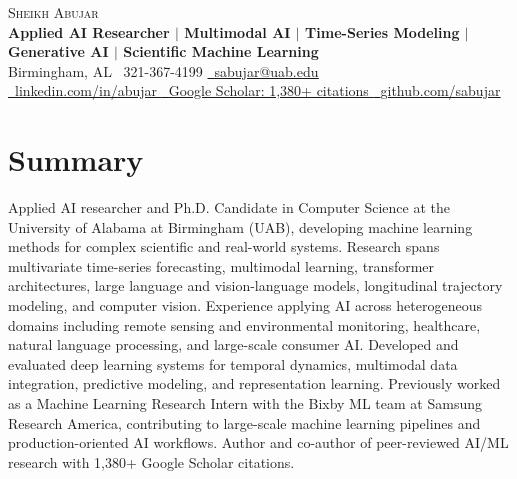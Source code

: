 \documentclass[letterpaper,10pt]{article}
\begin{document}

\begin{center}

    {\Huge \scshape Sheikh Abujar} \\[-1pt]

    \textbf{
    Applied AI Researcher $\mid$
    Multimodal AI $\mid$
    Time-Series Modeling $\mid$
    Generative AI $\mid$
    Scientific Machine Learning
    }
    \\[3pt]

    Birmingham, AL
    \quad
    \raisebox{-0.1\height}\faPhone\
    321-367-4199
    \quad
    \href{mailto:sabujar@uab.edu}{
        \raisebox{-0.2\height}\faEnvelope\
        \underline{sabujar@uab.edu}
    }
    \\[2pt]

    \href{https://linkedin.com/in/abujar/}{
        \faLinkedin\
        \underline{linkedin.com/in/abujar}
    }
    \quad
    \href{https://scholar.google.com/citations?user=s2ocyEgAAAAJ}{
        \faGraduationCap\
        \underline{Google Scholar: 1,380+ citations}
    }
    \quad
    \href{https://github.com/sabujar}{
        \faGithub\
        \underline{github.com/sabujar}
    }

\end{center}

\vspace{-11pt}


\section{Summary}

\small
\justifying

Applied AI researcher and Ph.D. Candidate in Computer Science at the
University of Alabama at Birmingham (UAB), developing machine learning
methods for complex scientific and real-world systems. Research spans
multivariate time-series forecasting, multimodal learning, transformer
architectures, large language and vision-language models, longitudinal
trajectory modeling, and computer vision. Experience applying AI across
heterogeneous domains including remote sensing and environmental monitoring,
healthcare, natural language processing, and large-scale consumer AI.
Developed and evaluated deep learning systems for temporal dynamics,
multimodal data integration, predictive modeling, and representation
learning. Previously worked as a Machine Learning Research Intern with the Bixby ML team at Samsung Research America, contributing to large-scale machine learning pipelines and production-oriented AI workflows. Author and co-author of peer-reviewed
AI/ML research with 1,380+ Google Scholar citations.
\end{document}
